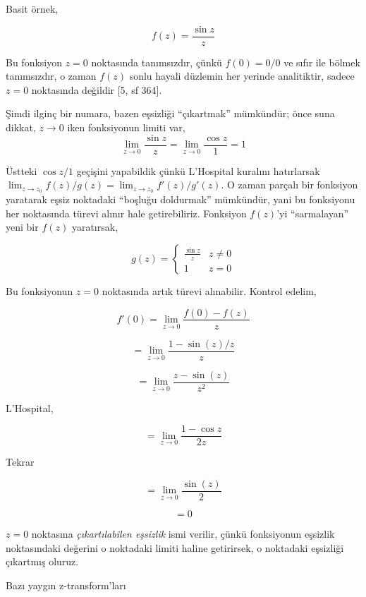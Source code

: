 \documentclass[12pt,fleqn]{article}\usepackage{../../common}
\begin{document}
Basit örnek, 

$$ f(z) = \frac{ \sin z}{z} $$

Bu fonksiyon $z=0$ noktasında tanımsızdır, çünkü $f(0) = 0/0$ ve sıfır ile
bölmek tanımsızdır, o zaman $f(z)$ sonlu hayali düzlemin her yerinde
analitiktir, sadece $z=0$ noktasında değildir [5, sf 364]. 

Şimdi ilginç bir numara, bazen eşsizliği ``çıkartmak'' mümkündür; önce suna
dikkat, $z \to 0$ iken fonksiyonun limiti var,
$$ \lim_{z \to 0} \frac{ \sin z}{z} = \lim_{z \to 0} \frac{\cos z}{1} = 1 $$


Üstteki $\cos z/1$ geçişini yapabildik çünkü L'Hospital kuralını hatırlarsak
$\lim_{z \to z_0} f(z)/g(z) = \lim_{z \to z_0} f'(z)/g'(z)$. O zaman parçalı bir
fonksiyon yaratarak eşsiz noktadaki ``boşluğu doldurmak'' mümkündür, yani bu
fonksiyonu her noktasında türevi alınır hale getirebiliriz. Fonksiyon $f(z)$'yi
``sarmalayan'' yeni bir $f(z)$ yaratırsak,

$$ 
g(z) = \left\{ \begin{array}{ll}
\frac{\sin z}{z} & z \ne 0 \\
1 & z = 0
\end{array} \right.
 $$

Bu fonksiyonun $z=0$ noktasında artık türevi alınabilir. Kontrol edelim, 

$$ f'(0) = \lim_{z \to 0} \frac{f(0)-f(z)}{z}  $$

$$ = \lim_{z \to 0} \frac{1-\sin(z)/z}{z} $$

$$ = \lim_{z \to 0} \frac{z-\sin(z)}{z^2} $$

L'Hospital,

$$ = \lim_{z \to 0} \frac{1 - \cos z}{2z} $$

Tekrar

$$ = \lim_{z \to 0} \frac{ \sin(z)}{2} $$

$$ = 0 $$

$z=0$ noktasına {\em çıkartılabilen eşsizlik} ismi verilir, çünkü
fonksiyonun eşsizlik noktasındaki değerini o noktadaki limiti haline
getirirsek, o noktadaki eşsizliği çıkartmış oluruz. 

\newpage



\newpage

Bazı yaygın z-transform'ları 
\end{document}
